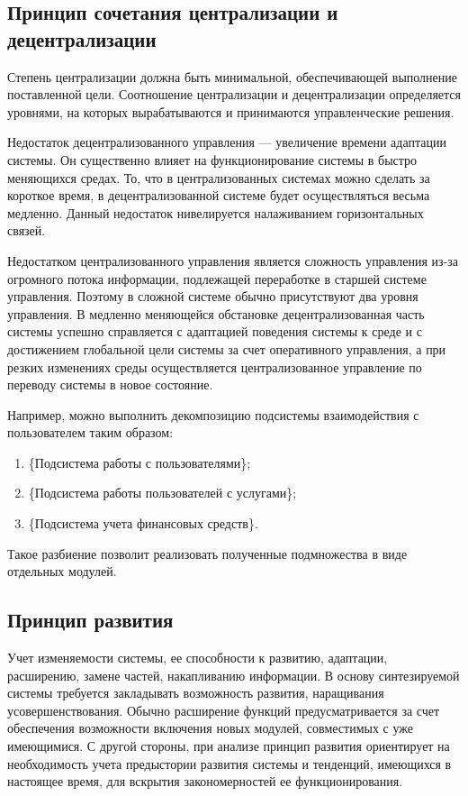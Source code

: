 \subsection{Принцип сочетания централизации и децентрализации}

Степень централизации должна быть минимальной, обеспечивающей выполнение поставленной цели.
Соотношение централизации и децентрализации определяется уровнями, на которых вырабатываются и принимаются управленческие решения.

Недостаток децентрализованного управления --- увеличение времени адаптации системы.
Он существенно влияет на функционирование системы в быстро меняющихся средах.
То, что в централизованных системах можно сделать за короткое время, в децентрализованной системе будет осуществляться весьма медленно.
Данный недостаток нивелируется налаживанием горизонтальных связей.

Недостатком централизованного управления является сложность управления из-за огромного потока информации, подлежащей переработке в старшей системе управления.
Поэтому в сложной системе обычно присутствуют два уровня управления.
В медленно меняющейся обстановке децентрализованная часть системы успешно справляется с адаптацией поведения системы к среде и с достижением глобальной цели системы за счет оперативного управления, а при резких изменениях среды осуществляется централизованное управление по переводу системы в новое состояние.

Например, можно выполнить декомпозицию подсистемы взаимодействия с пользователем таким образом:
\begin{enumerate}
  \item \{Подсистема работы с пользователями\};
  \item \{Подсистема работы пользователей с услугами\};
  \item \{Подсистема учета финансовых средств\}.
\end{enumerate}

Такое разбиение позволит реализовать полученные подмножества в виде отдельных модулей.

\subsection{Принцип развития}

Учет изменяемости системы, ее способности к развитию, адаптации, расширению, замене частей, накапливанию информации.
В основу синтезируемой системы требуется закладывать возможность развития, наращивания усовершенствования.
Обычно расширение функций предусматривается за счет обеспечения возможности включения новых модулей, совместимых с уже имеющимися.
С другой стороны, при анализе принцип развития ориентирует на необходимость учета предыстории развития системы и тенденций, имеющихся в настоящее время, для вскрытия закономерностей ее функционирования.

